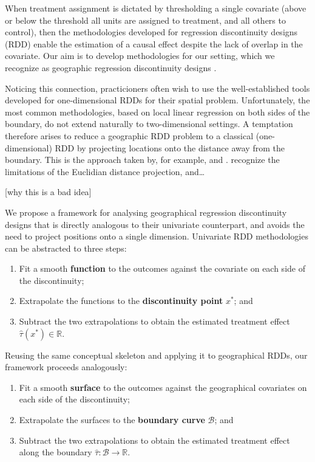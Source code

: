 \documentclass[letter]{article}
\providecommand{\tightlist}{%
      \setlength{\itemsep}{0pt}\setlength{\parskip}{0pt}}
\newcommand{\boundary}{\mathcal{B}}
\providecommand{\tightlist}{%
  	  \setlength{\itemsep}{0pt}\setlength{\parskip}{0pt}}
\renewcommand{\cite}[1]{\citep{#1}}
\begin{document}
When treatment assignment is dictated by thresholding a single covariate (above or below the threshold all units are assigned to treatment, and all others to control), then the methodologies developed for regression discontinuity designs (RDD) enable the estimation of a causal effect despite the lack of overlap in the covariate. Our aim is to develop methodologies for our setting, which we recognize as geographic regression discontinuity designs \cite{keele_titiunik_2015}.

Noticing this connection, practicioners often wish to use the well-established tools developed for one-dimensional RDDs for their spatial problem.
Unfortunately, the most common methodologies, based on local linear regression on both sides of the boundary, do not extend naturally to two-dimensional settings.
A temptation therefore arises to reduce a geographic RDD problem to a classical (one-dimensional) RDD by projecting locations onto the distance away from the boundary.
This is the approach taken by, for example, \cite{macdonald2015effect} and \cite{chen2013evidence}. \cite{keele_titiunik_2015} recognize the limitations of the Euclidian distance projection, and\ldots{}

{[}why this is a bad idea{]}
    


    	We propose a framework for analysing geographical regression discontinuity designs that is directly analogous to their univariate counterpart, and avoids the need to project positions onto a single dimension.
Univariate RDD methodologies can be abstracted to three steps:

\begin{enumerate}
\def\labelenumi{\arabic{enumi}.}
\tightlist
\item
  Fit a smooth \textbf{function} to the outcomes against the covariate on each side of the discontinuity;
\item
  Extrapolate the functions to the \textbf{discontinuity point} \(x^*\); and
\item
  Subtract the two extrapolations to obtain the estimated treatment effect \(\hat\tau(x^*) \in \mathbb{R}\).
\end{enumerate}

Reusing the same conceptual skeleton and applying it to geographical RDDs, our framework proceeds analogously:

\begin{enumerate}
\def\labelenumi{\arabic{enumi}.}
\tightlist
\item
  Fit a smooth \textbf{surface} to the outcomes against the geographical covariates on each side of the discontinuity;
\item
  Extrapolate the surfaces to the \textbf{boundary curve} \(\boundary\); and
\item
  Subtract the two extrapolations to obtain the estimated treatment effect along the boundary \(\hat\tau: \boundary \rightarrow \mathbb{R}\).
\end{enumerate}
    
\end{document}
